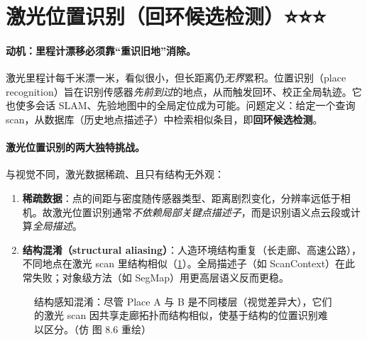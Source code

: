 \section{激光位置识别（回环候选检测）⭐⭐⭐}
\label{sec:lidar-place}

\paragraph{动机：里程计漂移必须靠“重识旧地”消除。}
激光里程计每千米漂一米，看似很小，但长距离仍\emph{无界}累积。位置识别（place recognition）旨在识别传感器\emph{先前到过}的地点，从而触发回环、校正全局轨迹\cite{carlone2026handbook}。它也使多会话 SLAM、先验地图中的全局定位成为可能。问题定义：给定一个查询 scan，从数据库（历史地点描述子）中检索相似条目，即\textbf{回环候选检测}。

\paragraph{激光位置识别的两大独特挑战。}
与视觉不同，激光数据稀疏、且只有结构无外观\cite{carlone2026handbook}：
\begin{enumerate}
  \item \textbf{稀疏数据}：点的间距与密度随传感器类型、距离剧烈变化，分辨率远低于相机。故激光位置识别通常\emph{不依赖局部关键点描述子}，而是识别语义点云段或计算\emph{全局描述}。
  \item \textbf{结构混淆（structural aliasing）}：人造环境结构重复（长走廊、高速公路），不同地点在激光 scan 里结构相似（\cref{fig:lidar-aliasing}）。全局描述子（如 ScanContext\cite{kim2018scancontext}）在此常失败；对象级方法（如 SegMap\cite{dube2017segmap}）用更高层语义反而更稳。
\end{enumerate}

\begin{figure}[ht]
\centering
{}
\caption{结构感知混淆：尽管 Place A 与 B 是不同楼层（视觉差异大），它们的激光 scan 因共享走廊拓扑而结构相似，使基于结构的位置识别难以区分。（仿 \cite{carlone2026handbook} 图 8.6 重绘）}
\label{fig:lidar-aliasing}
\end{figure}

